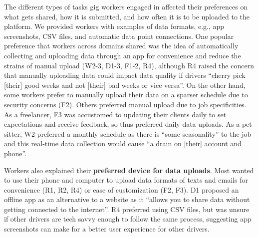 {The different types of tasks gig workers engaged in affected their} preferences on {what gets shared, how it is submitted, and how often it is} to be uploaded to the platform. 
We provided workers with examples of data formats, e.g., app screenshots, CSV files, and automatic data point connections. 
One popular preference {that workers across domains shared was the idea of} {automatically collecting and uploading data} through an app for convenience and reduce the strains of manual upload (W2{-}3, D1{-}3, F1{-}2, R4){, although R4 raised the concern} that manually uploading data could impact data quality if drivers ``cherry pick [their] good weeks and not [their] bad weeks or vice versa''. On the other hand, some workers prefer to manually upload their data on a sparser schedule due to security concerns (F2). Others preferred manual upload due to job specificities. As a freelancer, F3 was accustomed to updating their clients daily to set expectations and receive feedback, so {thus preferred} daily data uploads. As a pet sitter, W2 preferred a monthly schedule as there is ``some seasonality'' to the job and {this real-time data collection would cause} ``a drain on [their] account and phone''. 

Workers also explained their \textbf{preferred device for data uploads}. Most wanted to use their phone and computer to upload data formats of texts and emails for convenience (R1, R2, R4) or ease of customization (F2, F3). D1 proposed an offline app as an alternative to a website as it ``allows you to share data without getting connected to the internet''. R4 preferred using CSV files, but was unsure if other drivers are tech savvy enough to follow the same process, suggesting app screenshots can make for a better user experience for other drivers. 

